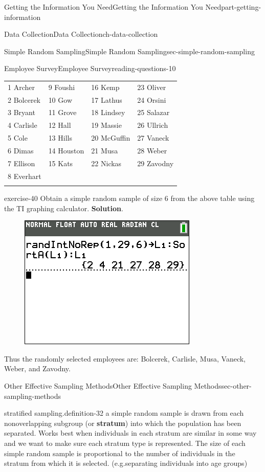 \documentclass[oneside,10pt,]{book}
\newcommand{\terminology}[1]{\textbf{#1}}
\numberwithin{equation}{section}
\newcommand{\hrulethin}  {\noalign{\hrule height 0.04em}}
\newcommand{\hrulethick} {\noalign{\hrule height 0.11em}}
\begin{document}
\begin{partptx}{Getting the Information You Need}{}{Getting the Information You Need}{}{}{part-getting-information}
\begin{chapterptx}{Data Collection}{}{Data Collection}{}{}{ch-data-collection}
\begin{sectionptx}{Simple Random Sampling}{}{Simple Random Sampling}{}{}{sec-simple-random-sampling}
\begin{reading-questions-subsection}{Employee Survey}{}{Employee Survey}{}{}{reading-questions-10}
\begin{tabular}{llll}
1 Archer&9 Foushi&16 Kemp&23 Oliver\tabularnewline\hrulethin
2 Bolcerek&10 Gow&17 Lathus&24 Orsini\tabularnewline\hrulethin
3 Bryant&11 Grove&18 Lindsey&25 Salazar\tabularnewline\hrulethin
4 Carlisle&12 Hall&19 Massie&26 Ullrich\tabularnewline\hrulethin
5 Cole&13 Hills&20 McGuffin&27 Vaneck\tabularnewline\hrulethin
6 Dimas&14 Houston&21 Musa&28 Weber\tabularnewline\hrulethin
7 Ellison&15 Kats&22 Nickas&29 Zavodny\tabularnewline\hrulethin
8 Everhart&&&\tabularnewline\hrulethick
\end{tabular}
%
\begin{divisionexercise}{1}{}{}{exercise-40}%
Obtain a simple random sample of size 6 from the above table using the TI graphing calculator. \textbf{Solution}.\hypertarget{solution-2}{}\quad%
\begin{figure}\centering\includegraphics[width=0.4\linewidth]{images/employee-survey.png}
\end{figure} Thus the randomly selected employees are: Bolcerek, Carlisle, Musa, Vaneck, Weber, and Zavodny.\end{divisionexercise}%
\end{reading-questions-subsection}
\end{sectionptx}
%
%
\typeout{************************************************}
\typeout{************************************************}
%
\begin{sectionptx}{Other Effective Sampling Methods}{}{Other Effective Sampling Methods}{}{}{sec-other-sampling-methods}
\begin{definition}{stratified sampling.}{definition-32}%
a simple random sample is drawn from each nonoverlapping subgroup (or \terminology{stratum}) into which the population has been separated.\hypertarget{p-19}{}%
Works best when individuals in each stratum are similar in some way and we want to make sure each stratum type is represented. The size of each simple random sample is proportional to the number of individuals in the stratum from which it is selected. (e.g.\@ separating individuals into age groups)%
\end{definition}

\end{sectionptx}
\end{chapterptx}
\end{partptx}
\end{document}

